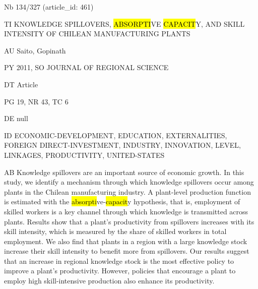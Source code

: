 \documentclass[a4paper]{article}
\begin{document}
\vspace*{-2cm}
Nb \tabto{0cm}134/327 (article\_id: 461)\par
TI \tabto{0cm}KNOWLEDGE SPILLOVERS, \hl{ABSORPTI}VE \hl{CAPACIT}Y, AND SKILL INTENSITY OF CHILEAN MANUFACTURING PLANTS\par
AU \tabto{0cm}Saito, Gopinath\par
PY \tabto{0cm}2011, SO JOURNAL OF REGIONAL SCIENCE\par
DT \tabto{0cm}Article\par
PG \tabto{0cm}19, NR 43, TC 6\par
DE \tabto{0cm}null\par
ID \tabto{0cm}ECONOMIC-DEVELOPMENT, EDUCATION, EXTERNALITIES, FOREIGN DIRECT-INVESTMENT, INDUSTRY, INNOVATION, LEVEL, LINKAGES, PRODUCTIVITY, UNITED-STATES\par
AB \tabto{0cm}Knowledge spillovers are an important source of economic growth. In this study, we identify a mechanism through which knowledge spillovers occur among plants in the Chilean manufacturing industry. A plant-level production function is estimated with the \hl{absorpti}ve-\hl{capacit}y hypothesis, that is, employment of skilled workers is a key channel through which knowledge is transmitted across plants. Results show that a plant's productivity from spillovers increases with its skill intensity, which is measured by the share of skilled workers in total employment. We also find that plants in a region with a large knowledge stock increase their skill intensity to benefit more from spillovers. Our results suggest that an increase in regional knowledge stock is the most effective policy to improve a plant's productivity. However, policies that encourage a plant to employ high skill-intensive production also enhance its productivity.\par
\clearpage
\end{document}
